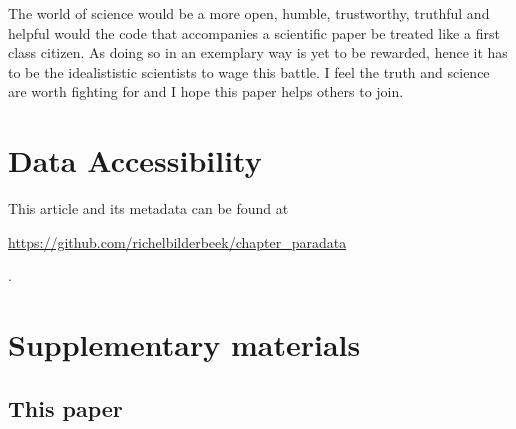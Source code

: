 
The world of science would be a more open, humble, trustworthy, truthful
and helpful would the code that accompanies a scientific paper
be treated like a first class citizen. As doing so in an exemplary way
is yet to be rewarded, hence it has to be the idealististic scientists
to wage this battle. I feel the truth and science are worth fighting for
and I hope this paper helps others to join.

\section{Data Accessibility}

This article and its metadata can be found at 
\begin{sloppypar}\url{https://github.com/richelbilderbeek/chapter_paradata}\end{sloppypar}.




\newpage
\appendix
\section{Supplementary materials}

\renewcommand{\thefigure}{S\arabic{figure}}
\setcounter{figure}{0}

\renewcommand{\thetable}{S\arabic{table}}
\setcounter{table}{0}

\subsection{This paper}

